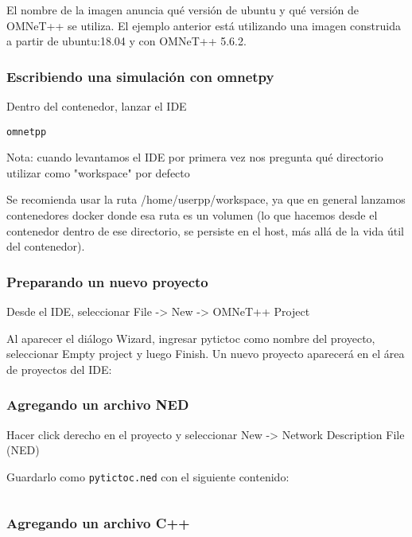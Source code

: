 \documentclass[]{article}
\begin{document}
El nombre de la imagen anuncia qué versión de ubuntu y qué versión de OMNeT++
se utiliza. El ejemplo anterior está utilizando una imagen construida a partir
de ubuntu:18.04 y con OMNeT++ 5.6.2.

\subsubsection{Escribiendo una simulación con omnetpy}

Dentro del contenedor, lanzar el IDE

\begin{verbatim}
omnetpp
\end{verbatim}

Nota: cuando levantamos el IDE por primera vez nos pregunta qué directorio
utilizar como "workspace" por defecto


Se recomienda usar la ruta /home/userpp/workspace, ya que en general lanzamos
contenedores docker donde esa ruta es un volumen (lo que hacemos desde el
contenedor dentro de ese directorio, se persiste en el host, más allá de la
vida útil del contenedor).

\subsubsection{Preparando un nuevo proyecto}

Desde el IDE, seleccionar File -> New -> OMNeT++ Project


Al aparecer el diálogo Wizard, ingresar pytictoc como nombre del proyecto,
seleccionar Empty project y luego Finish. Un nuevo proyecto aparecerá en el
área de proyectos del IDE:


\subsubsection{Agregando un archivo NED}

Hacer click derecho en el proyecto y seleccionar New -> Network Description File (NED)


Guardarlo como \verb!pytictoc.ned! con el siguiente contenido:

\inputminted{text}{codelistings/tictoc.ned}

\subsubsection{Agregando un archivo C++}
\end{document}

